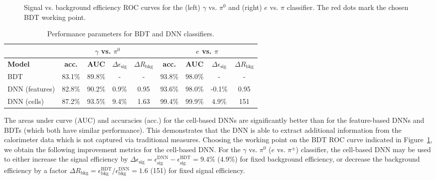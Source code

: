 \begin{figure}[!t]
    \centering
    \caption{Signal vs. background efficiency ROC curves for the (left) $\gamma$ vs. $\pi^0$ and (right) $e$ vs. $\pi$ classifier. The red dots mark the chosen BDT working point.}
    \label{ROCs}
\end{figure}

\begin{table}[!ht]
    \centering
    \begin{tabular}[!t]{l|cccc|cccc}
        \hline
        & \multicolumn{4}{c}{\textbf{$\gamma$ vs. $\pi^0$}} & \multicolumn{4}{c}{\textbf{$e$ vs. $\pi$}}\\
        \hline
        \textbf{Model} & \textbf{acc.} &  \textbf{AUC} & \textbf{$\Delta \epsilon_{\mathrm{sig}}$} & \textbf{$\Delta R_{\mathrm{bkg}}$} & \textbf{acc.} &  \textbf{AUC} & \textbf{$\Delta \epsilon_{\mathrm{sig}}$} & \textbf{$\Delta R_{\mathrm{bkg}}$} \\
        \hline
        \centering
        BDT & 83.1\% & 89.8\% & - & - & 93.8\% & 98.0\% & - & - \\
        DNN (features) & 82.8\% & 90.2\% & 0.9\% & 0.95 & 93.6\% & 98.0\% & -0.1\% & 0.95 \\
        DNN (cells) & 87.2\% & 93.5\% & 9.4\% & 1.63 & 99.4\% & 99.9\% & 4.9\% & 151 \\
        \hline
        \hline
    \end{tabular}
    \vspace{5pt}
    \caption{Performance parameters for BDT and DNN classifiers.} 
    \label{AUCs}
\end{table}

The areas under curve (AUC) and accuracies (acc.) for the cell-based DNNs are significantly better than for the feature-based DNNs and BDTs (which both have similar performance). This demonstrates that the DNN is able to extract additional information from the calorimeter data which is not captured via traditional measures. Choosing the working point on the BDT ROC curve indicated in Figure~\ref{ROCs}, we obtain the following improvement metrics for the cell-based DNN. For the $\gamma$ vs. $\pi^0$ ($e$ vs. $\pi^\pm$) classifier, the cell-based DNN may be used to either increase the signal efficiency by $\Delta \epsilon_{\mathrm{sig}} = \epsilon_{\mathrm{sig}}^{\mathrm{DNN}} - \epsilon_{\mathrm{sig}}^{\mathrm{BDT}}=9.4$\% (4.9\%) for fixed background efficiency, or decrease the background efficiency by a factor $\Delta R_{\mathrm{bkg}} = \epsilon_{\mathrm{bkg}}^{\mathrm{BDT}} / \epsilon_{\mathrm{bkg}}^{\mathrm{DNN}}= 1.6$ (151) for fixed signal efficiency.

